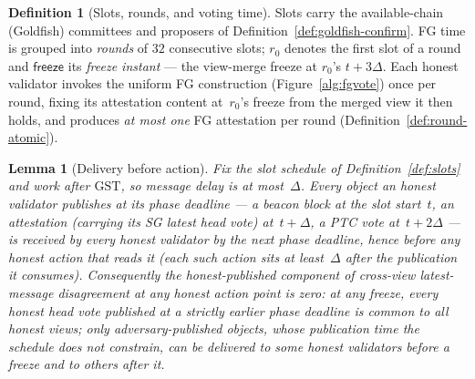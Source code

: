 \ifx\litemode\undefined\documentclass{article}\fi
\newcommand{\freeze}{\ensuremath{\mathsf{freeze}}}
\newcommand{\GST}{\ensuremath{\mathrm{GST}}\xspace}
\newcommand{\rzero}{\ensuremath{r_{0}}}                 %
\theoremstyle{plain}
\newtheorem{lemma}{Lemma}
\theoremstyle{definition}
\newtheorem{definition}{Definition}
\theoremstyle{remark}
\begin{document}
\begin{definition}[Slots, rounds, and voting time]
Slots carry the available-chain (Goldfish) committees and proposers of
Definition~\ref{def:goldfish-confirm}.  FG time is grouped into \emph{rounds}
of $32$ consecutive slots; $\rzero$ denotes the first slot of a round and
$\freeze$ its \emph{freeze instant} --- the view-merge freeze at $\rzero$'s
$t+3\Delta$.  Each honest validator invokes the uniform FG construction
(Figure~\ref{alg:fgvote}) once per round, fixing its attestation content
at~$\rzero$'s freeze from the merged view it then holds, and produces \emph{at
most one} FG attestation per round (Definition~\ref{def:round-atomic}).
\end{definition}

\begin{lemma}[Delivery before action]\label{lem:delivery-before-action}
Fix the slot schedule of Definition~\ref{def:slots} and work after \GST, so
message delay is at most~\(\Delta\).  Every object an honest validator publishes
at its phase deadline --- a beacon block at the slot start~\(t\), an attestation
(carrying its SG latest head vote) at~\(t+\Delta\), a PTC vote at~\(t+2\Delta\)
--- is received by every honest validator by the next phase deadline, hence
before any honest action that reads it (each such action sits at least~\(\Delta\)
after the publication it consumes).  Consequently the \emph{honest-published}
component of cross-view latest-message disagreement at any honest action point
is zero: at any freeze, every honest head vote published at a strictly earlier
phase deadline is common to all honest views; only
adversary-published objects, whose publication time the schedule does not
constrain, can be delivered to some honest validators before a freeze and to
others after it.
\end{lemma}
\end{document}
